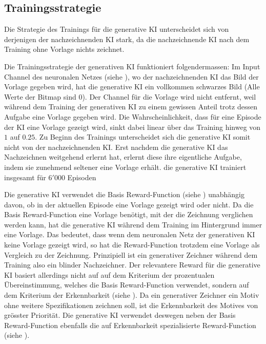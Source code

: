 \subsection{Trainingsstrategie}\label{sub:m_gen_train} Die Strategie des
Trainings für die generative KI unterscheidet sich von derjenigen der
nachzeichnenden KI stark, da die nachzeichnende KI nach dem Training ohne
Vorlage nichts zeichnet.

Die Trainingsstrategie der generativen KI funktioniert folgendermassen: Im Input
Channel des neuronalen Netzes (siehe ), wo der
nachzeichnenden KI das Bild der Vorlage gegeben wird, hat die generative KI ein
vollkommen schwarzes Bild (Alle Werte der Bitmap sind $0$). Der Channel für die
Vorlage wird nicht entfernt, weil während dem Training der generativen KI zu
einem gewissen Anteil trotz dessen Aufgabe eine Vorlage gegeben wird. Die
Wahrscheinlichkeit, dass für eine Episode der KI eine Vorlage gezeigt wird,
sinkt dabei linear über das Training hinweg von $1$ auf $0.25$. Zu Beginn des
Trainings unterscheidet sich die generative KI somit nicht von der
nachzeichnenden KI. Erst nachdem die generative KI das Nachzeichnen weitgehend
erlernt hat, erlernt diese ihre eigentliche Aufgabe, indem sie zunehmend
seltener eine Vorlage erhält. die generative KI trainiert insgesamt für $6'000$
Episoden

Die generative KI verwendet die Basis Reward-Function (siehe
) unabhängig davon, ob in der aktuellen Episode eine
Vorlage gezeigt wird oder nicht. Da die Basis Reward-Function eine Vorlage
benötigt, mit der die Zeichnung verglichen werden kann, hat die generative KI
während dem Training im Hintergrund immer eine Vorlage. Das bedeutet, dass wenn
dem neuronalen Netz der generativen KI keine Vorlage gezeigt wird, so hat die
Reward-Function trotzdem eine Vorlage als Vergleich zu der Zeichnung.
Prinzipiell ist ein generativer Zeichner während dem Training also ein blinder
Nachzeichner. Der relevantere Reward für die generative KI basiert allerdings
nicht auf auf dem Kriterium der prozentualen Übereinstimmung, welches die Basis
Reward-Function verwendet, sondern auf dem Kriterium der Erkennbarkeit (siehe
). Da ein generativer Zeichner ein Motiv ohne weitere
Spezifikationen zeichnen soll, ist die Erkennbarkeit des Motives von grösster
Priorität. Die generative KI verwendet deswegen neben der Basis Reward-Function
ebenfalls die auf Erkennbarkeit spezialisierte Reward-Function (siehe
). 

